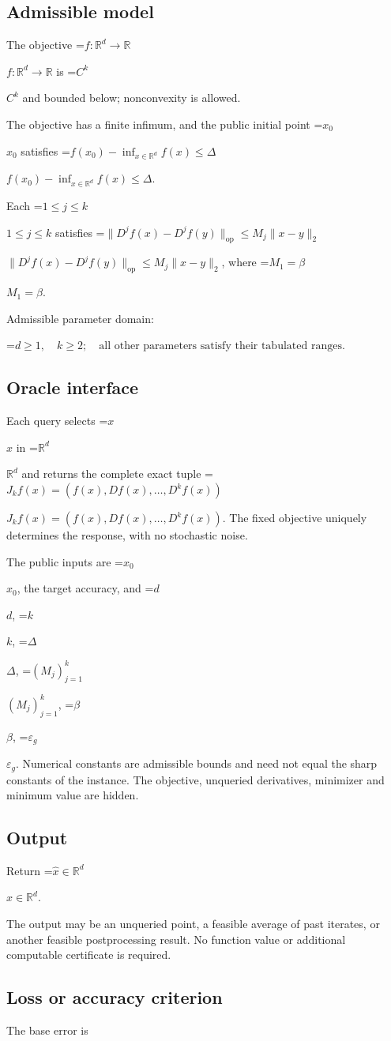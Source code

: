 \documentclass[10pt,a4paper]{article}
\newcommand{\AtlasMath}[1]{\par\begingroup\centering\setbox0=\hbox{$\displaystyle #1$}\ifdim\wd0>1.4\linewidth\typeout{ATLAS WIDE FORMULA: \the\wd0}\fi\ifdim\wd0>\linewidth\resizebox{\linewidth}{!}{\box0}\else\box0\fi\par\endgroup}
\newcommand{\AtlasInlineMath}[1]{\begingroup\setbox0=\hbox{$#1$}\ifdim\wd0>.4\linewidth\endgroup\AtlasMath{#1}\else\endgroup$#1$\fi}
\begin{document}
\subsection{Admissible model}
The objective \AtlasInlineMath{f:\mathbb{R}^d\to\mathbb{R}} is \AtlasInlineMath{C^k} and bounded below; nonconvexity is allowed.

The objective has a finite infimum, and the public initial point \AtlasInlineMath{x_0} satisfies \AtlasInlineMath{f(x_0)-\inf_{x\in \mathbb{R}^d}f(x)\le\Delta}.

Each \AtlasInlineMath{1\le j\le k} satisfies \AtlasInlineMath{\|D^jf(x)-D^jf(y)\|_{\mathrm{op}}\le M_j\|x-y\|_2}, where \AtlasInlineMath{M_1=\beta}.

Admissible parameter domain:


\AtlasMath{d\ge1,\quad k\ge2;\quad\text{all other parameters satisfy their tabulated ranges}.}


\subsection{Oracle interface}
Each query selects \AtlasInlineMath{x} in \AtlasInlineMath{\mathbb{R}^d} and returns the complete exact tuple \AtlasInlineMath{J_{k}f(x)=(f(x),Df(x),\ldots,D^{k}f(x))}. The fixed objective uniquely determines the response, with no stochastic noise.

The public inputs are \AtlasInlineMath{x_0}, the target accuracy, and \AtlasInlineMath{d}, \AtlasInlineMath{k}, \AtlasInlineMath{\Delta}, \AtlasInlineMath{(M_j)_{j=1}^k}, \AtlasInlineMath{\beta}, \AtlasInlineMath{\varepsilon_g}. Numerical constants are admissible bounds and need not equal the sharp constants of the instance. The objective, unqueried derivatives, minimizer and minimum value are hidden.

\subsection{Output}
Return \AtlasInlineMath{\widehat{x}\in \mathbb{R}^d}.

The output may be an unqueried point, a feasible average of past iterates, or another feasible postprocessing result. No function value or additional computable certificate is required.

\subsection{Loss or accuracy criterion}
The base error is
\end{document}
